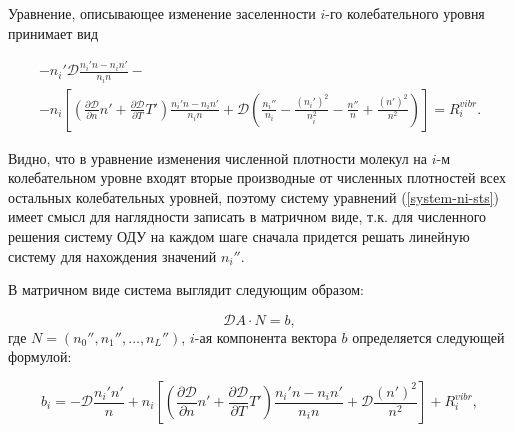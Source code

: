 \documentclass[12pt]{article}
\begin{document}
Уравнение, описывающее изменение заселенности $i$-го колебательного уровня принимает вид

\begin{multline}
  -n_{i}' \mathcal{D} \frac{n_{i}'n - n_{i}n'}{n_{i}n} - \\  %
  - n_{i} \left[\left(\frac{\partial \mathcal{D}}{\partial n}n' + \frac{\partial \mathcal{D}}{\partial T}T' \right) \frac{n_{i}'n - n_{i}n'}{n_{i}n} + \mathcal{D}\left(\frac{n_{i}''}{n_{i}} - \frac{\left(n_{i}'\right)^2}{n_{i}^2} - \frac{n''}{n} + \frac{\left(n'\right)^2}{n^2} \right) \right]
  = R_{i}^{vibr}.\label{system-ni-sts}
\end{multline}

Видно, что в уравнение изменения численной плотности молекул на $i$-м колебательном уровне входят вторые производные от численных плотностей всех остальных колебательных уровней, поэтому систему уравнений (\ref{system-ni-sts}) имеет смысл для наглядности записать в матричном виде, т.к. для численного решения систему ОДУ на каждом шаге сначала придется решать линейную систему для нахождения значений $n_{i}''$.

В матричном виде система выглядит следующим образом:

\begin{equation}
  \mathcal{D} A \cdot N = b,
\end{equation}
где $N=\left(n_{0}'', n_{1}'', \ldots, n_{L}''\right)$, $i$-ая компонента вектора $b$ определяется следующей формулой:


\begin{equation}
  b_{i} = -\mathcal{D} \frac{n_{i}'n'}{n} + n_{i} \left[\left(\frac{\partial \mathcal{D}}{\partial n}n' + \frac{\partial \mathcal{D}}{\partial T}T' \right) \frac{n_{i}'n - n_{i}n'}{n_{i}n} +  \mathcal{D}\frac{\left(n'\right)^2}{n^2}\right] + R_{i}^{vibr},
\end{equation}
\end{document}
